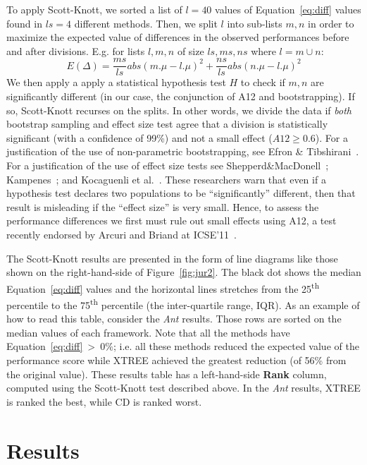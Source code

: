\documentclass[twocolumn,5p]{elsarticle}
\newcommand{\fig}[1]{Figure~\ref{fig:#1}}
\newcommand{\eq}[1]{Equation~\ref{eq:#1}}
\theoremstyle{break}
\begin{document}
	To  apply Scott-Knott,
	we
	sorted a list of  $l=40$ values of \eq{diff} values found in  $ls=4$ 
	different methods.
	Then, we split $l$ into sub-lists $m,n$ in order to maximize the expected 
	value of differences in the observed performances before and after 
	divisions. E.g. for lists $l,m,n$ of size $ls,ms,ns$ where $l=m\cup n$: 
	\[E(\Delta)=\frac{ms}{ls}abs(m.\mu - l.\mu)^2 + \frac{ns}{ls}abs(n.\mu - 
	l.\mu)^2\]
	We then apply a apply a statistical hypothesis test $H$ to check
	if $m,n$ are significantly different  (in our case, the conjunction of A12 
	and bootstrapping). If so, Scott-Knott recurses on the splits. In other 
	words, we divide the data if \textit{both} bootstrap sampling and effect 
	size test agree that a division is statistically significant (with a 
	confidence of 99\%) and not a small effect ($A12 \ge 0.6$).
	For a justification of the use of non-parametric bootstrapping, see Efron 
	\& Tibshirani~\cite[p220-223]{efron93}. For a justification of the use of 
	effect size tests see Shepperd\&MacDonell~\cite{shepperd12a}; 
	Kampenes~\cite{kampenes07}; and Kocaguenli et 
	al.~\cite{Kocaguneli2013:ep}. 
	These researchers warn that even if a hypothesis test declares two 
	populations to be ``significantly'' different, then that result is 
	misleading if the ``effect size'' is very small. Hence, to assess the 
	performance differences we first must rule out small effects using A12, a 
	test   recently endorsed by Arcuri and Briand at ICSE'11~\cite{arcuri11}.
	
	The Scott-Knott  results are presented in the form of line diagrams like 
	those shown on the right-hand-side of \fig{jur2}.
	The black dot shows the median \eq{diff} values and the horizontal lines 
	stretches
	from the 25\textsuperscript{th} percentile to the 75\textsuperscript{th} 
	percentile (the inter-quartile range, IQR).
	As an example of how to read this table, consider the {\em Ant}
	results. Those rows are  sorted on the median values of each framework. 
	Note 
	that all the methods have \eq{diff}~\textgreater~$0\%$; i.e. all these 
	methods reduced the expected value of the performance score while XTREE 
	achieved the greatest reduction (of 56\% from the original value).
	These results table has a  left-hand-side  {\bf Rank} column, computed 
	using the
	Scott-Knott test described above. In the {\em Ant}
	results, XTREE is ranked the best, while CD is  ranked   worst.
	
	
	\section{Results}
	\label{sect:results}
	
\end{document}
